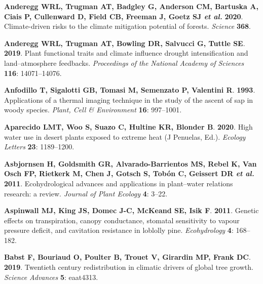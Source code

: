 \documentclass[11pt,twoside]{reedthesis}
\begin{document}
\hypertarget{ref-Anderegg2020}{}
\textbf{\textnormal{Anderegg WRL}, \textnormal{Trugman AT},
\textnormal{Badgley G}, \textnormal{Anderson CM}, \textnormal{Bartuska
A}, \textnormal{Ciais P}, \textnormal{Cullenward D}, \textnormal{Field
CB}, \textnormal{Freeman J}, \textnormal{Goetz SJ} \emph{et al.}}
\textbf{2020}. Climate-driven risks to the climate mitigation potential
of forests. \emph{Science} \textbf{368}.

\hypertarget{ref-anderegg_plant_2019}{}
\textbf{\textnormal{Anderegg WRL}, \textnormal{Trugman AT},
\textnormal{Bowling DR}, \textnormal{Salvucci G}, \textnormal{Tuttle
SE}}. \textbf{2019}. Plant functional traits and climate influence
drought intensification and land--atmosphere feedbacks.
\emph{Proceedings of the National Academy of Sciences} \textbf{116}:
14071--14076.

\hypertarget{ref-Anfodillo1993}{}
\textbf{\textnormal{Anfodillo T}, \textnormal{Sigalotti GB},
\textnormal{Tomasi M}, \textnormal{Semenzato P}, \textnormal{Valentini
R}}. \textbf{1993}. Applications of a thermal imaging technique in the
study of the ascent of sap in woody species. \emph{Plant, Cell \&
Environment} \textbf{16}: 997--1001.

\hypertarget{ref-aparecido_high_2020}{}
\textbf{\textnormal{Aparecido LMT}, \textnormal{Woo S},
\textnormal{Suazo C}, \textnormal{Hultine KR}, \textnormal{Blonder B}}.
\textbf{2020}. High water use in desert plants exposed to extreme heat
(J Penuelas, Ed.). \emph{Ecology Letters} \textbf{23}: 1189--1200.

\hypertarget{ref-Asbjornsen2011}{}
\textbf{\textnormal{Asbjornsen H}, \textnormal{Goldsmith GR},
\textnormal{Alvarado-Barrientos MS}, \textnormal{Rebel K},
\textnormal{Van Osch FP}, \textnormal{Rietkerk M}, \textnormal{Chen J},
\textnormal{Gotsch S}, \textnormal{Tobón C}, \textnormal{Geissert DR}
\emph{et al.}} \textbf{2011}. Ecohydrological advances and applications
in plant--water relations research: a review. \emph{Journal of Plant
Ecology} \textbf{4}: 3--22.

\hypertarget{ref-aspinwall_genetic_2011}{}
\textbf{\textnormal{Aspinwall MJ}, \textnormal{King JS},
\textnormal{Domec J-C}, \textnormal{McKeand SE}, \textnormal{Isik F}}.
\textbf{2011}. Genetic effects on transpiration, canopy conductance,
stomatal sensitivity to vapour pressure deficit, and cavitation
resistance in loblolly pine. \emph{Ecohydrology} \textbf{4}: 168--182.

\hypertarget{ref-babst_twentieth_2019}{}
\textbf{\textnormal{Babst F}, \textnormal{Bouriaud O},
\textnormal{Poulter B}, \textnormal{Trouet V}, \textnormal{Girardin MP},
\textnormal{Frank DC}}. \textbf{2019}. Twentieth century redistribution
in climatic drivers of global tree growth. \emph{Science Advances}
\textbf{5}: eaat4313.
\end{document}
